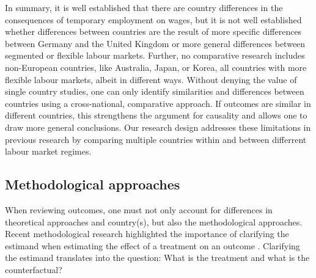 \documentclass[12pt]{article}
\begin{document}

In summary, it is well established that there are country differences in the consequences of temporary employment on wages, but it is not well established whether differences between countries are the result of more specific differences between Germany and the United Kingdom or more general differences between segmented or flexible labour markets.  Further, no comparative research includes non-European countries, like Australia, Japan, or  Korea, all countries with more flexible labour markets, albeit in different ways.  Without denying the value of single country studies, one can only identify similarities and differences between countries using a cross-national, comparative approach.  If outcomes are similar in different countries, this strengthens the argument for causality and allows one to draw more general conclusions.  Our research design addresses these limitations in previous research by comparing multiple countries within and between differrent labour market regimes.

\subsection{Methodological approaches}\label{subsec:methodological_approaches}

When reviewing outcomes, one must not only account for differences in theoretical approaches and country(s), but also the methodological approaches.  Recent methodological research highlighted the importance of clarifying the estimand when estimating the effect of a treatment on an outcome \citep{lundberg_what_2021}.  Clarifying the estimand translates into the question: What is the treatment and what is the counterfactual?  

\end{document}
